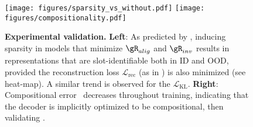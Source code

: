 \documentclass{article} %
\theoremstyle{plain}
\theoremstyle{definition}
\theoremstyle{remark}
\numberwithin{equation}{section}
\begin{document}
\begin{figure}
    \centering
    \texttt{[image: figures/sparsity\_vs\_without.pdf]}
    \texttt{[image: figures/compositionality.pdf]}
    \vspace{-9mm}
    \caption{
        \textbf{Experimental validation.}
        \textbf{Left}: As predicted by ,  inducing sparsity in models that minimize $\gR_{alig}$ and $\gR_{inv}$ results in representations that are slot-identifiable both in ID and OOD, provided the reconstruction loss $\mathcal{L}_\text{rec}$ (as in ) is also minimized  (see heat-map). A similar trend is observed for the $\mathcal{L}_\text{KL}$.
        \textbf{Right}: Compositional error~ decreases throughout training, indicating that the decoder is implicitly optimized to be compositional, then validating .
        \vspace{-0.5cm}
    }\label{fig:scatterplots}
\end{figure}
\end{document}
